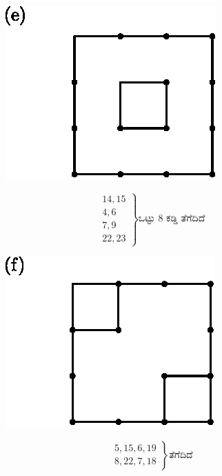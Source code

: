 \begin{enumerate}
\begin{minipage}[c]{4cm}
\begin{figure}[H]
\centering
\includegraphics{images/chap8/ans13e.eps}
\end{figure}
\end{minipage}
\qquad
\begin{minipage}[c]{4cm}
\begin{equation*}
\left.
\begin{aligned}
14, 15\\
4, 6\\
7, 9\\
22, 23
\end{aligned}
\right\}
\text{ಒಟ್ಟು  8 ಕಡ್ಡಿ ತೆಗೆದಿದೆ}
\end{equation*}
\end{minipage}

\begin{minipage}[c]{4cm}
\begin{figure}[H]
\centering
\includegraphics{images/chap8/ans13f.eps}
\end{figure}
\end{minipage}
\begin{minipage}[c]{5cm}
\begin{equation*}
\left.
\begin{aligned}
5, 15, 6, 19\\
8, 22, 7, 18
\end{aligned}
\right\}
\text{ತೆಗೆದಿದೆ}
\end{equation*}
\end{minipage}


\end{enumerate}
